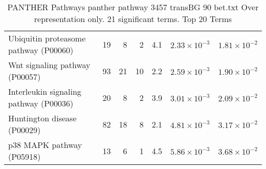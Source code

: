 \begin{table}[ht]
\begin{adjustbox}{width=\textwidth}
\begin{tabular}{lrrrrrr}
  Ubiquitin proteasome pathway (P00060) & 19 & 8 & 2 & 4.1 & $2.33 \times 10^{-3}$ & $1.81 \times 10^{-2}$ \\ 
  Wnt signaling pathway (P00057) & 93 & 21 & 10 & 2.2 & $2.59 \times 10^{-3}$ & $1.90 \times 10^{-2}$ \\ 
  Interleukin signaling pathway (P00036) & 20 & 8 & 2 & 3.9 & $3.01 \times 10^{-3}$ & $2.09 \times 10^{-2}$ \\ 
  Huntington disease (P00029) & 82 & 18 & 8 & 2.1 & $4.81 \times 10^{-3}$ & $3.17 \times 10^{-2}$ \\ 
  p38 MAPK pathway (P05918) & 13 & 6 & 1 & 4.5 & $5.86 \times 10^{-3}$ & $3.68 \times 10^{-2}$ \\ 
   \hline
\end{tabular}
\end{adjustbox}
\caption{PANTHER Pathways panther pathway 3457 transBG 90 bet.txt Over representation only. 21 significant terms. Top 20 Terms} 
\label{tab:PANTHER Pathways panther pathway 3457 transBG 90 bet.txt Over representation only. 21 significant terms. Top 20 Terms}
\end{table}



